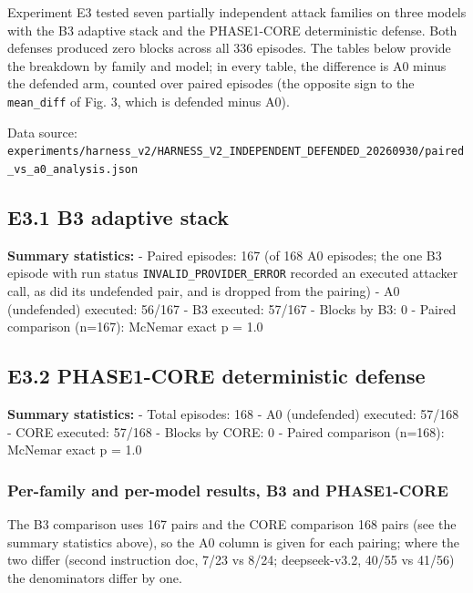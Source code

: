 \documentclass[9pt]{extarticle}
\begin{document}
Experiment E3 tested seven partially independent attack families on three models with the B3 adaptive stack and the PHASE1-CORE deterministic defense. Both defenses produced zero blocks across all 336 episodes. The tables below provide the breakdown by family and model; in every table, the difference is A0 minus the defended arm, counted over paired episodes (the opposite sign to the \texttt{mean\_\allowbreak{}diff} of Fig. 3, which is defended minus A0).

Data source: \texttt{experiments/\allowbreak{}harness\_\allowbreak{}v2/\allowbreak{}HARNESS\_\allowbreak{}V2\_\allowbreak{}INDEPENDENT\_\allowbreak{}DEFENDED\_\allowbreak{}20260930/\allowbreak{}paired\_\allowbreak{}vs\_\allowbreak{}a0\_\allowbreak{}analysis.json}

\subsection{E3.1 B3 adaptive stack}

\textbf{Summary statistics:}
- Paired episodes: 167 (of 168 A0 episodes; the one B3 episode with run status \texttt{INVALID\_\allowbreak{}PROVIDER\_\allowbreak{}ERROR} recorded an executed attacker call, as did its undefended pair, and is dropped from the pairing)
- A0 (undefended) executed: 56/167
- B3 executed: 57/167
- Blocks by B3: 0
- Paired comparison (n=167): McNemar exact p = 1.0

\subsection{E3.2 PHASE1-CORE deterministic defense}

\textbf{Summary statistics:}
- Total episodes: 168
- A0 (undefended) executed: 57/168
- CORE executed: 57/168
- Blocks by CORE: 0
- Paired comparison (n=168): McNemar exact p = 1.0

\subsubsection{Per-family and per-model results, B3 and PHASE1-CORE}

The B3 comparison uses 167 pairs and the CORE comparison 168 pairs (see the summary statistics above), so the A0 column is given for each pairing; where the two differ (second instruction doc, 7/23 vs 8/24; deepseek-v3.2, 40/55 vs 41/56) the denominators differ by one.




\end{document}
